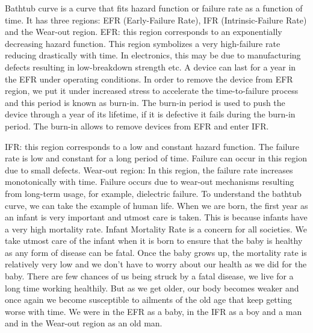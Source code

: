 \noindent Bathtub curve is a curve that fits hazard function or failure rate as a function of time. It has three regions: EFR (Early-Failure Rate), IFR (Intrinsic-Failure Rate) and the Wear-out region. 
EFR: this region corresponds to an exponentially decreasing hazard function. This region symbolizes a very high-failure rate reducing drastically with time. In electronics, this may be due to manufacturing defects resulting in low-breakdown strength etc. 
A device can last for a year in the EFR under operating conditions. In order to remove the device from EFR region, we put it under increased stress to accelerate the time-to-failure process and this period is known as burn-in. The burn-in period is used to push the device through a year of its lifetime, if it is defective it fails during the burn-in period. The burn-in allows to remove devices from EFR and enter IFR.


\noindent IFR: this region corresponds to a low and constant hazard function. The failure rate is low and constant for a long period of time. Failure can occur in this region due to small defects.
Wear-out region: In this region, the failure rate increases monotonically with time. Failure occurs due to wear-out mechanisms resulting from long-term usage, for example, dielectric failure.
To understand the bathtub curve, we can take the example of human life. When we are born, the first year as an infant is very important and utmost care is taken. This is because infants have a very high mortality rate. Infant Mortality Rate is a concern for all societies. We take utmost care of the infant when it is born to ensure that the baby is healthy as any form of disease can be fatal. Once the baby grows up, the mortality rate is relatively very low and we don’t have to worry about our health as we did for the baby. There are few chances of us being struck by a fatal disease, we live for a long time working healthily. But as we get older, our body becomes weaker and once again we become susceptible to ailments of the old age that keep getting worse with time.
We were in the EFR as a baby, in the IFR as a boy and a man and in the Wear-out region as an old man.



